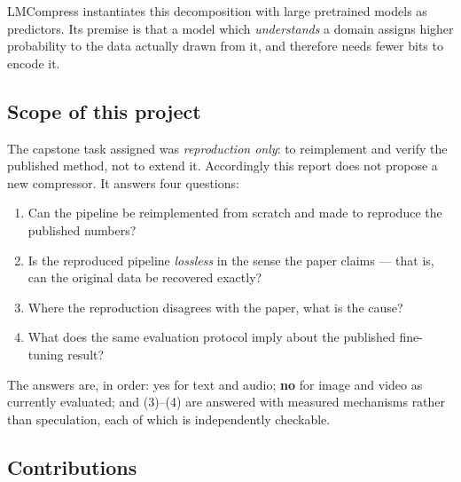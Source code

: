 \documentclass[11pt,a4paper]{article}
\begin{document}
LMCompress instantiates this decomposition with large pretrained models as
predictors. Its premise is that a model which \emph{understands} a domain
assigns higher probability to the data actually drawn from it, and therefore
needs fewer bits to encode it.

\subsection{Scope of this project}

The capstone task assigned was \emph{reproduction only}: to reimplement and
verify the published method, not to extend it. Accordingly this report does not
propose a new compressor. It answers four questions:

\begin{enumerate}[leftmargin=1.4em,itemsep=2pt]
\item Can the pipeline be reimplemented from scratch and made to reproduce the
      published numbers?
\item Is the reproduced pipeline \emph{lossless} in the sense the paper claims
      --- that is, can the original data be recovered exactly?
\item Where the reproduction disagrees with the paper, what is the cause?
\item What does the same evaluation protocol imply about the published
      fine-tuning result?
\end{enumerate}

The answers are, in order: yes for text and audio; \textbf{no} for image and
video as currently evaluated; and (3)--(4) are answered with measured mechanisms
rather than speculation, each of which is independently checkable.

\subsection{Contributions}
\end{document}
